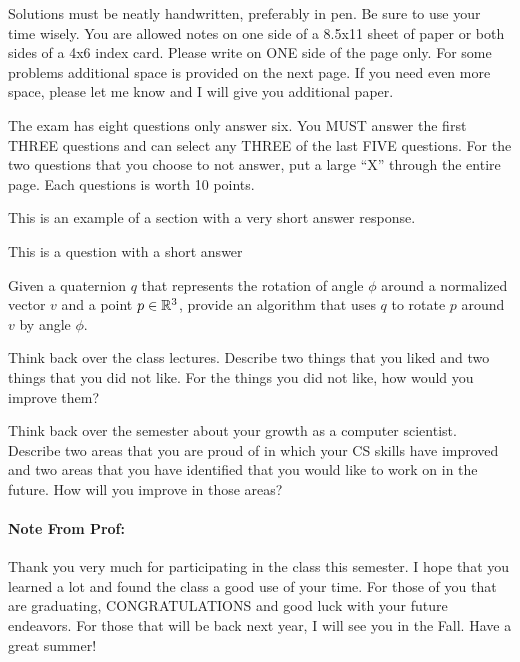 \documentclass[11pt]{article}
\begin{document}
\pageHeader{\course: \proj}

Solutions must be neatly handwritten, preferably in pen.  Be sure to use your
time wisely.  You are allowed notes on one side of a 8.5x11 sheet of paper or
both sides of a 4x6 index card.  Please write on ONE side of the page only.  For
some problems additional space is provided on the next page.  If you need even
more space, please let me know and I will give you additional paper.

The exam has eight questions only answer six.  You MUST answer the first THREE
questions and can select any THREE of the last FIVE questions.  For the two
questions that you choose to not answer, put a large ``X'' through the entire
page.  Each questions is worth 10 points.



This is an example of a section with a very short answer response.

\veryShortAnswer


This is a question with a short answer

\shortAnswer


Given a quaternion $q$ that represents the rotation of angle $\phi$ around a
normalized vector $v$ and a point $p \in \mathbb{R}^3$, provide an algorithm that uses
$q$ to rotate $p$ around $v$ by angle $\phi$.



Think back over the class lectures.  Describe two things that you liked and two
things that you did not like.  For the things you did not like, how would you
improve them?

\shortAnswer


Think back over the semester about your growth as a computer scientist.
Describe two areas that you are proud of in which your CS skills have improved
and two areas that you have identified that you would like to work on in the
future.  How will you improve in those areas?

\shortAnswer

\paragraph{Note From Prof:} Thank you very much for participating in the class
this semester.  I hope that you learned a lot and found the class a good use of
your time.  For those of you that are graduating, CONGRATULATIONS and good luck
with your future endeavors.  For those that will be back next year, I will see
you in the Fall.  Have a great summer!
\end{document}
